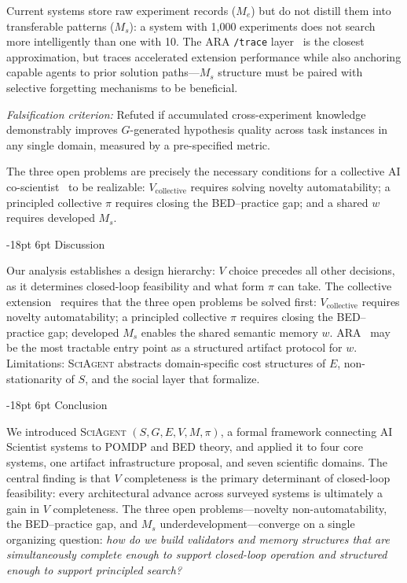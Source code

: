 \documentclass[11pt]{article}
\makeatletter
\renewcommand\section{\@startsection{section}{1}{\z@}%
  {-18pt \@plus -4pt \@minus -2pt}%
  {6pt \@plus 2pt}%
  {\normalfont\large\bfseries}}
\newcommand{\sgmvpi}{$(S, G, E, V, M, \pi)$}
\newcommand{\framework}{\textsc{SciAgent}}
\makeatother
\begin{document}
Current systems store raw experiment records ($M_e$) but do not distill them into transferable patterns ($M_s$): a system with 1,000 experiments does not search more intelligently than one with 10. The ARA \texttt{/trace} layer~\citep{liu2026lasthuman} is the closest approximation, but traces accelerated extension performance while also anchoring capable agents to prior solution paths---$M_s$ structure must be paired with selective forgetting mechanisms to be beneficial.

\textit{Falsification criterion:} Refuted if accumulated cross-experiment knowledge demonstrably improves $G$-generated hypothesis quality across task instances in any single domain, measured by a pre-specified metric.

\noindent The three open problems are precisely the necessary conditions for a collective AI co-scientist~\citep{taniguchi2024cpc} to be realizable: $V_\text{collective}$ requires solving novelty automatability; a principled collective $\pi$ requires closing the BED--practice gap; and a shared $w$ requires developed $M_s$.

\section{Discussion}
\label{sec:discussion}

Our analysis establishes a design hierarchy: $V$ choice precedes all other decisions, as it determines closed-loop feasibility and what form $\pi$ can take. The collective extension~\citep{taniguchi2024cpc} requires that the three open problems be solved first: $V_\text{collective}$ requires novelty automatability; a principled collective $\pi$ requires closing the BED--practice gap; developed $M_s$ enables the shared semantic memory $w$. ARA~\citep{liu2026lasthuman} may be the most tractable entry point as a structured artifact protocol for $w$. Limitations: \framework{} abstracts domain-specific cost structures of $E$, non-stationarity of $S$, and the social layer that \citet{taniguchi2024cpc} formalize.

\section{Conclusion}
\label{sec:conclusion}

We introduced \framework{} \sgmvpi{}, a formal framework connecting AI Scientist systems to POMDP and BED theory, and applied it to four core systems, one artifact infrastructure proposal, and seven scientific domains. The central finding is that $V$ completeness is the primary determinant of closed-loop feasibility: every architectural advance across surveyed systems is ultimately a gain in $V$ completeness. The three open problems---novelty non-automatability, the BED--practice gap, and $M_s$ underdevelopment---converge on a single organizing question: \textit{how do we build validators and memory structures that are simultaneously complete enough to support closed-loop operation and structured enough to support principled search?}
\end{document}
